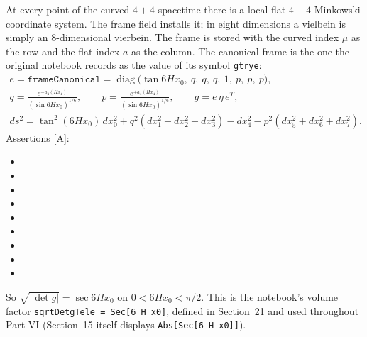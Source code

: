 At every point of the curved $4+4$ spacetime there is a local flat $4+4$ Minkowski coordinate
system. The frame field installs it; in eight dimensions a vielbein is simply an 8-dimensional
vierbein. The frame is stored with the curved index $\mu$ as the row and the flat index $a$ as
the column. The canonical frame is the one the original notebook records as the value of its
symbol \texttt{gtrye}:
\begin{gather}
  e = \texttt{frameCanonical} = \operatorname{diag}\bigl(\tan 6Hx_0,\ q,\ q,\ q,\ 1,\ p,\ p,\ p\bigr),\\
  q = \frac{e^{-a_4(Hx_4)}}{(\sin 6Hx_0)^{1/6}},\qquad p = \frac{e^{+a_4(Hx_4)}}{(\sin 6Hx_0)^{1/6}},\qquad
  g = e\,\eta\,e^{T},\\
  ds^2 = \tan^2(6Hx_0)\,dx_0^2 + q^2(dx_1^2+dx_2^2+dx_3^2) - dx_4^2 - p^2(dx_5^2+dx_6^2+dx_7^2).
\end{gather}
Assertions [A]:
\begin{itemize}
  \item {}
  \item {}
  \item {}
  \item {}
  \item {}
  \item {}
  \item {}
  \item {}
  \item {}
\end{itemize}
So $\sqrt{|\det g|}=\sec 6Hx_0$ on $0<6Hx_0<\pi/2$. This is the notebook's volume factor
\texttt{sqrtDetgTele = Sec[6 H x0]}, defined in Section~21 and used throughout Part VI
(Section~15 itself displays \texttt{Abs[Sec[6 H x0]]}).

